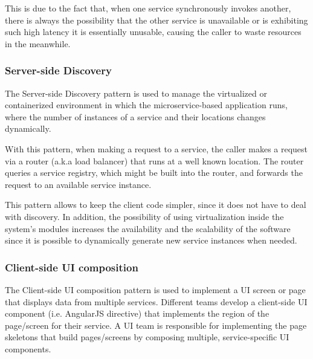 This is due to the fact that, when one service synchronously invokes another, there is always the possibility that the other service is unavailable or is exhibiting such high latency it is essentially unusable, causing the caller to waste resources in the meanwhile.

\subsubsection{Server-side Discovery}
The Server-side Discovery pattern is used to manage the virtualized or containerized environment in which the microservice-based application runs, where the number of instances of a service and their locations changes dynamically.

With this pattern, when making a request to a service, the caller makes a request via a router (a.k.a load balancer) that runs at a well known location. The router queries a service registry, which might be built into the router, and forwards the request to an available service instance.

This pattern allows to keep the client code simpler, since it does not have to deal with discovery. In addition, the possibility of using virtualization inside the system’s modules increases the availability and the scalability of the software since it is possible to dynamically generate new service instances when needed.

\subsubsection{Client-side UI composition}
The Client-side UI composition pattern is used to implement a UI screen or page that displays data from multiple services. Different teams develop a client-side UI component (i.e. AngularJS directive) that implements the region of the page/screen for their service. A UI team is responsible for implementing the page skeletons that build pages/screens by composing multiple, service-specific UI components. 